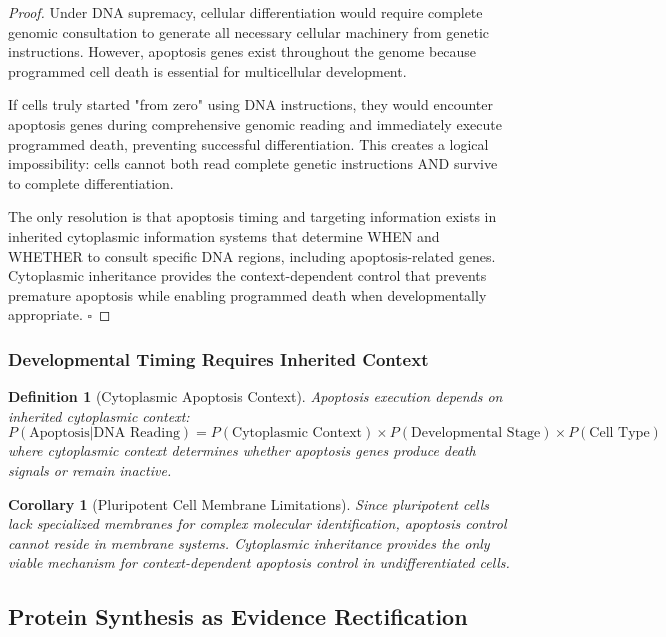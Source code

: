 \documentclass[12pt,a4paper]{article}
\newtheorem{definition}{Definition}
\newtheorem{corollary}{Corollary}
\begin{document}
\begin{proof}
Under DNA supremacy, cellular differentiation would require complete genomic consultation to generate all necessary cellular machinery from genetic instructions. However, apoptosis genes exist throughout the genome because programmed cell death is essential for multicellular development.

If cells truly started "from zero" using DNA instructions, they would encounter apoptosis genes during comprehensive genomic reading and immediately execute programmed death, preventing successful differentiation. This creates a logical impossibility: cells cannot both read complete genetic instructions AND survive to complete differentiation.

The only resolution is that apoptosis timing and targeting information exists in inherited cytoplasmic information systems that determine WHEN and WHETHER to consult specific DNA regions, including apoptosis-related genes. Cytoplasmic inheritance provides the context-dependent control that prevents premature apoptosis while enabling programmed death when developmentally appropriate. $\square$
\end{proof}

\subsubsection{Developmental Timing Requires Inherited Context}

\begin{definition}[Cytoplasmic Apoptosis Context]
Apoptosis execution depends on inherited cytoplasmic context:
\begin{equation}
P(\text{Apoptosis}|\text{DNA Reading}) = P(\text{Cytoplasmic Context}) \times P(\text{Developmental Stage}) \times P(\text{Cell Type})
\end{equation}
where cytoplasmic context determines whether apoptosis genes produce death signals or remain inactive.
\end{definition}

\begin{corollary}[Pluripotent Cell Membrane Limitations]
Since pluripotent cells lack specialized membranes for complex molecular identification, apoptosis control cannot reside in membrane systems. Cytoplasmic inheritance provides the only viable mechanism for context-dependent apoptosis control in undifferentiated cells.
\end{corollary}

\subsection{Protein Synthesis as Evidence Rectification}
\end{document}

